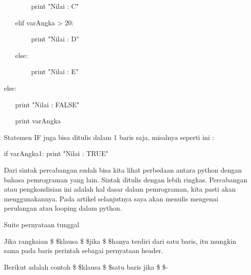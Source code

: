  $  $  $  $  $  $  $  $  $  $  $  $  $  $  $  $  $  $  $  $  $  $  $  $ print "Nilai : C" \par
\vspace{12pt}
\noindent 
 $  $  $  $  $  $  $  $  $  $  $  $elif varAngka > 20: \par
\vspace{12pt}
\noindent 
 $  $  $  $  $  $  $  $  $  $  $  $  $  $  $  $  $  $  $  $  $  $  $  $ print "Nilai : D" \par
\vspace{12pt}
\noindent 
 $  $  $  $  $  $  $  $  $  $  $  $else: \par
\vspace{12pt}
\noindent 
 $  $  $  $  $  $  $  $  $  $  $  $  $  $  $  $  $  $  $  $  $  $  $  $ print "Nilai : E" \par
\vspace{12pt}
\noindent 
else: \par
\vspace{12pt}
\noindent 
 $  $  $  $  $  $  $  $  $  $  $  $print "Nilai : FALSE" \par
\vspace{12pt}
\noindent 
 $  $  $  $  $  $  $  $  $  $  $  $print varAngka \par
\vspace{12pt}
\noindent 
Statemen IF juga bisa ditulis dalam 1 baris saja, misalnya seperti ini :  \par
\vspace{12pt}
\noindent 
if varAngka1: print "Nilai : TRUE" \par
\vspace{12pt}
\noindent 
Dari sintak percabangan sudah bisa kita lihat perbedaan antara python dengan bahasa pemrograman yang lain. Sintak ditulis dengan lebih ringkas. Percabangan atau pengkondisian ini adalah hal dasar dalam pemrograman, kita pasti akan menggunakannya. Pada artikel selanjutnya saya akan menulis mengenai perulangan atau looping dalam python. \par
\vspace{12pt}
\noindent 
Suite pernyataan tunggal \par
\vspace{12pt}
\noindent 
Jika rangkaian \$  \$klausa \$  \$jika \$  \$hanya terdiri dari satu baris, itu mungkin sama pada baris perintah sebagai pernyataan header. \par
\vspace{12pt}
\noindent 
Berikut adalah contoh \$  \$klausa \$  \$satu baris jika \$  \$- \par
